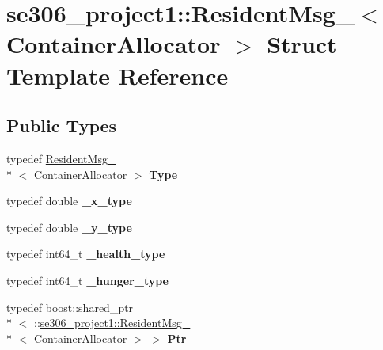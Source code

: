 \hypertarget{structse306__project1_1_1ResidentMsg__}{\section{se306\-\_\-project1\-:\-:Resident\-Msg\-\_\-$<$ Container\-Allocator $>$ Struct Template Reference}
\label{structse306__project1_1_1ResidentMsg__}
}
\subsection*{Public Types}
\begin{DoxyCompactItemize}
\item 
\hypertarget{structse306__project1_1_1ResidentMsg___a333e27c02fbdf82c901465a81a269879}{typedef \hyperlink{structse306__project1_1_1ResidentMsg__}{Resident\-Msg\-\_\-}\\*
$<$ Container\-Allocator $>$ {\bfseries Type}}\label{structse306__project1_1_1ResidentMsg___a333e27c02fbdf82c901465a81a269879}

\item 
\hypertarget{structse306__project1_1_1ResidentMsg___aed11a4164de0fa5bb9e7c547819df2e7}{typedef double {\bfseries \-\_\-x\-\_\-type}}\label{structse306__project1_1_1ResidentMsg___aed11a4164de0fa5bb9e7c547819df2e7}

\item 
\hypertarget{structse306__project1_1_1ResidentMsg___a773c4b54a924b543415ee970b0e7cf9a}{typedef double {\bfseries \-\_\-y\-\_\-type}}\label{structse306__project1_1_1ResidentMsg___a773c4b54a924b543415ee970b0e7cf9a}

\item 
\hypertarget{structse306__project1_1_1ResidentMsg___aa605c10d11cd8e7ef671df029cfe7abd}{typedef int64\-\_\-t {\bfseries \-\_\-health\-\_\-type}}\label{structse306__project1_1_1ResidentMsg___aa605c10d11cd8e7ef671df029cfe7abd}

\item 
\hypertarget{structse306__project1_1_1ResidentMsg___ac65e01c8745d6fe8287e3364499d2ebc}{typedef int64\-\_\-t {\bfseries \-\_\-hunger\-\_\-type}}\label{structse306__project1_1_1ResidentMsg___ac65e01c8745d6fe8287e3364499d2ebc}

\item 
\hypertarget{structse306__project1_1_1ResidentMsg___ab2377a7f29370a11badbb8469ab8b811}{typedef boost\-::shared\-\_\-ptr\\*
$<$ \-::\hyperlink{structse306__project1_1_1ResidentMsg__}{se306\-\_\-project1\-::\-Resident\-Msg\-\_\-}\\*
$<$ Container\-Allocator $>$ $>$ {\bfseries Ptr}}\label{structse306__project1_1_1ResidentMsg___ab2377a7f29370a11badbb8469ab8b811}


\end{DoxyCompactItemize}
